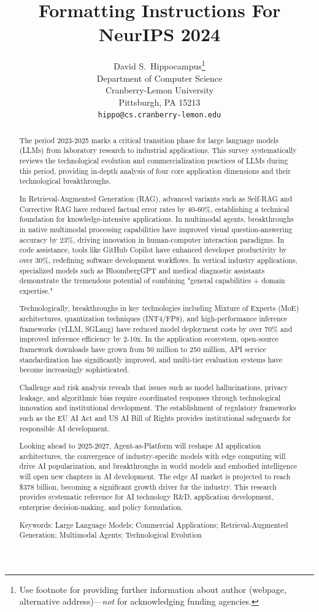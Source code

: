 \documentclass{article}
\title{Formatting Instructions For NeurIPS 2024}
\author{%
  David S.~Hippocampus\thanks{Use footnote for providing further information
    about author (webpage, alternative address)---\emph{not} for acknowledging
    funding agencies.} \\
  Department of Computer Science\\
  Cranberry-Lemon University\\
  Pittsburgh, PA 15213 \\
  \texttt{hippo@cs.cranberry-lemon.edu} \\
}
\begin{document}
\maketitle


\begin{abstract}
  The period 2023-2025 marks a critical transition phase for large language models (LLMs) from laboratory research to industrial applications. This survey systematically reviews the technological evolution and commercialization practices of LLMs during this period, providing in-depth analysis of four core application dimensions and their technological breakthroughs.

  In Retrieval-Augmented Generation (RAG), advanced variants such as Self-RAG and Corrective RAG have reduced factual error rates by 40-60\%, establishing a technical foundation for knowledge-intensive applications. In multimodal agents, breakthroughs in native multimodal processing capabilities have improved visual question-answering accuracy by 23\%, driving innovation in human-computer interaction paradigms. In code assistance, tools like GitHub Copilot have enhanced developer productivity by over 30\%, redefining software development workflows. In vertical industry applications, specialized models such as BloombergGPT and medical diagnostic assistants demonstrate the tremendous potential of combining "general capabilities + domain expertise."

  Technologically, breakthroughs in key technologies including Mixture of Experts (MoE) architectures, quantization techniques (INT4/FP8), and high-performance inference frameworks (vLLM, SGLang) have reduced model deployment costs by over 70\% and improved inference efficiency by 2-10x. In the application ecosystem, open-source framework downloads have grown from 50 million to 250 million, API service standardization has significantly improved, and multi-tier evaluation systems have become increasingly sophisticated.

  Challenge and risk analysis reveals that issues such as model hallucinations, privacy leakage, and algorithmic bias require coordinated responses through technological innovation and institutional development. The establishment of regulatory frameworks such as the EU AI Act and US AI Bill of Rights provides institutional safeguards for responsible AI development.

  Looking ahead to 2025-2027, Agent-as-Platform will reshape AI application architectures, the convergence of industry-specific models with edge computing will drive AI popularization, and breakthroughs in world models and embodied intelligence will open new chapters in AI development. The edge AI market is projected to reach \$378 billion, becoming a significant growth driver for the industry. This research provides systematic reference for AI technology R\&D, application development, enterprise decision-making, and policy formulation.

  Keywords: Large Language Models; Commercial Applications; Retrieval-Augmented Generation; Multimodal Agents; Technological Evolution
\end{abstract} 
\end{document}
